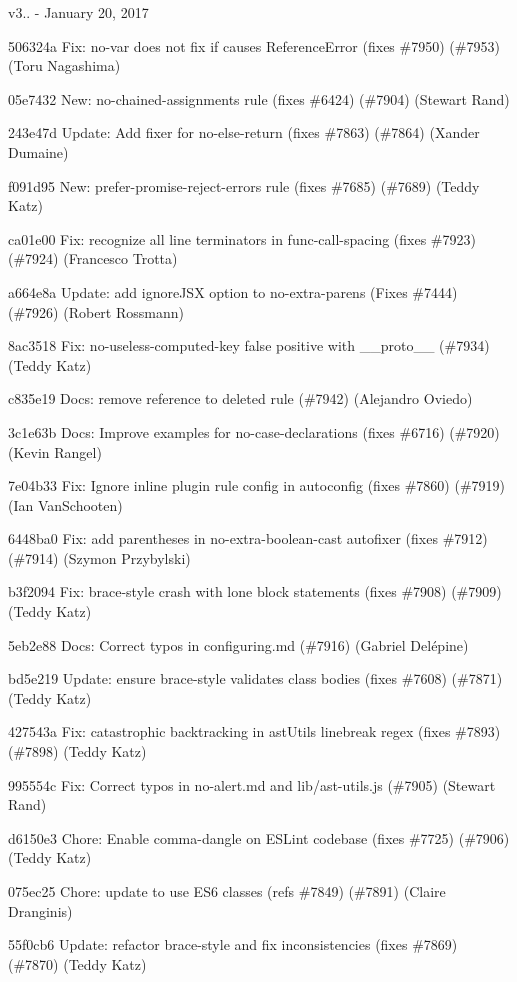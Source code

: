 v3.. -\/ January 20, 2017


\begin{DoxyItemize}
\item 506324a Fix\+: {\ttfamily no-\/var} does not fix if causes Reference\+Error (fixes \#7950) (\#7953) (Toru Nagashima)
\item 05e7432 New\+: no-\/chained-\/assignments rule (fixes \#6424) (\#7904) (Stewart Rand)
\item 243e47d Update\+: Add fixer for no-\/else-\/return (fixes \#7863) (\#7864) (Xander Dumaine)
\item f091d95 New\+: {\ttfamily prefer-\/promise-\/reject-\/errors} rule (fixes \#7685) (\#7689) (Teddy Katz)
\item ca01e00 Fix\+: recognize all line terminators in func-\/call-\/spacing (fixes \#7923) (\#7924) (Francesco Trotta)
\item a664e8a Update\+: add ignore\+JSX option to no-\/extra-\/parens (Fixes \#7444) (\#7926) (Robert Rossmann)
\item 8ac3518 Fix\+: no-\/useless-\/computed-\/key false positive with {\ttfamily \+\_\+\+\_\+proto\+\_\+\+\_\+} (\#7934) (Teddy Katz)
\item c835e19 Docs\+: remove reference to deleted rule (\#7942) (Alejandro Oviedo)
\item 3c1e63b Docs\+: Improve examples for no-\/case-\/declarations (fixes \#6716) (\#7920) (Kevin Rangel)
\item 7e04b33 Fix\+: Ignore inline plugin rule config in autoconfig (fixes \#7860) (\#7919) (Ian Van\+Schooten)
\item 6448ba0 Fix\+: add parentheses in no-\/extra-\/boolean-\/cast autofixer (fixes \#7912) (\#7914) (Szymon Przybylski)
\item b3f2094 Fix\+: brace-\/style crash with lone block statements (fixes \#7908) (\#7909) (Teddy Katz)
\item 5eb2e88 Docs\+: Correct typos in configuring.\+md (\#7916) (Gabriel Delépine)
\item bd5e219 Update\+: ensure brace-\/style validates class bodies (fixes \#7608) (\#7871) (Teddy Katz)
\item 427543a Fix\+: catastrophic backtracking in ast\+Utils linebreak regex (fixes \#7893) (\#7898) (Teddy Katz)
\item 995554c Fix\+: Correct typos in no-\/alert.\+md and lib/ast-\/utils.\+js (\#7905) (Stewart Rand)
\item d6150e3 Chore\+: Enable comma-\/dangle on ESLint codebase (fixes \#7725) (\#7906) (Teddy Katz)
\item 075ec25 Chore\+: update to use ES6 classes (refs \#7849) (\#7891) (Claire Dranginis)
\item 55f0cb6 Update\+: refactor brace-\/style and fix inconsistencies (fixes \#7869) (\#7870) (Teddy Katz)
\end{DoxyItemize}


